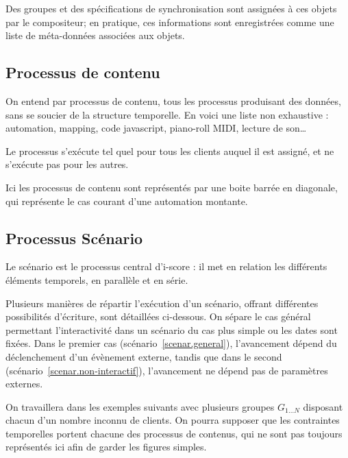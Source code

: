 \documentclass[10pt]{article}
\begin{document}
Des groupes et des spécifications de synchronisation sont assignées à ces objets par le compositeur; en pratique, ces informations sont enregistrées comme une liste de méta-données associées aux objets.


\subsection{Processus de contenu}
On entend par processus de contenu, tous les processus produisant des données, sans se soucier de la structure temporelle. 
En voici une liste non exhaustive : automation, mapping, code javascript, piano-roll MIDI, lecture de son\dots

Le processus s'exécute tel quel pour tous les clients auquel il est assigné, 
et ne s'exécute pas pour les autres.

Ici les processus de contenu sont représentés par une boite barrée en diagonale, qui représente le cas courant d'une automation montante.

\subsection{Processus Scénario}
Le scénario est le processus central d'i-score : il met en relation les différents éléments temporels, en parallèle et en série.

Plusieurs manières de répartir l'exécution d'un scénario, offrant différentes possibilités d'écriture, sont détaillées ci-dessous. 
On sépare le cas général permettant l'interactivité dans un scénario du cas plus simple ou les dates sont fixées.
Dans le premier cas (scénario~\ref{scenar.general}), l'avancement dépend du déclenchement d'un évènement externe, tandis que dans le second (scénario~\ref{scenar.non-interactif}), l'avancement ne dépend pas de paramètres externes. 

On travaillera dans les exemples suivants avec plusieurs groupes $G_{1\dots N}$ disposant chacun d'un nombre inconnu de clients. 
On pourra supposer que les contraintes temporelles portent chacune des processus de contenus, qui ne sont pas toujours représentés ici afin de garder les figures simples.
\end{document}
